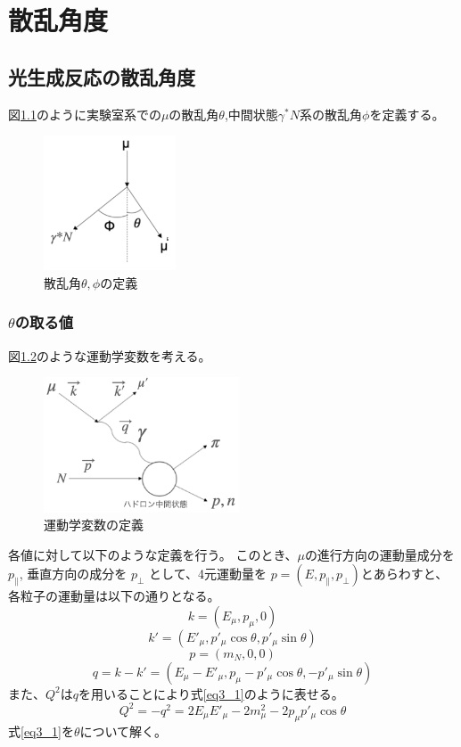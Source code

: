 \chapter{散乱角度}\label{cha:angle}
\section{光生成反応の散乱角度}
図\ref{fig:angle1}のように実験室系での$\mu$の散乱角$\theta$,中間状態$\gamma^*N$系の散乱角$\phi$を定義する。
\begin{figure}[H]
    \centering
    \includegraphics[height=4cm]{img/angle_diagram.png}
    \caption{散乱角$\theta, \phi$の定義}
    \label{fig:angle1}
\end{figure}

\subsection{$\theta$の取る値}
図\ref{fig:angle2}のような運動学変数を考える。
\begin{figure}[H]
    \centering
    \includegraphics[height=4cm]{img/diagram_3momentum.png}
    \caption{運動学変数の定義}
    \label{fig:angle2}
\end{figure}
各値に対して以下のような定義を行う。
このとき、$\mu$の進行方向の運動量成分を
$p_\parallel$, 垂直方向の成分を $p_\perp$ として、4元運動量を
$p = (E, p_\parallel, p_\perp) $とあらわすと、各粒子の運動量は以下の通りとなる。
\begin{equation}
    k = (E_\mu , p_\mu,0)
\end{equation}
\begin{equation}
    k' = (E'_\mu, p'_\mu \cos\theta, p'_\mu \sin\theta)
\end{equation}
\begin{equation}
    p = (m_N, 0, 0)
\end{equation}
\begin{equation}
    q = k-k'=(E_\mu - E'_\mu, p_\mu-p'_\mu \cos\theta, -p'_\mu \sin\theta)
\end{equation}
また、$Q^2$は$q$を用いることにより式\ref{eq3_1}のように表せる。
\begin{equation}
    \label{eq3_1}
    Q^2 = -q^2 = 2E_\mu E'_\mu -2m^2_\mu-2p_\mu p'_\mu \cos\theta
\end{equation}
式\ref{eq3_1}を$\theta$について解く。

